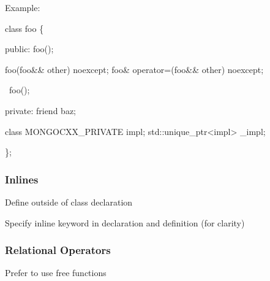 Example\+:


\begin{DoxyCode}
\textcolor{keyword}{class }foo \{

    \textcolor{keyword}{public}:
      foo();

      foo(foo&& other) noexcept;
      foo& operator=(foo&& other) noexcept;

      ~foo();

    private:
      friend baz;

      class MONGOCXX\_PRIVATE impl;
      std::unique\_ptr<impl> \_impl;

\};
\end{DoxyCode}


\subsubsection*{Inlines}


\begin{DoxyItemize}
\item Define outside of class declaration
\item Specify inline keyword in declaration and definition (for clarity)
\end{DoxyItemize}

\subsubsection*{Relational Operators}


\begin{DoxyItemize}
\item Prefer to use free functions 
\end{DoxyItemize}